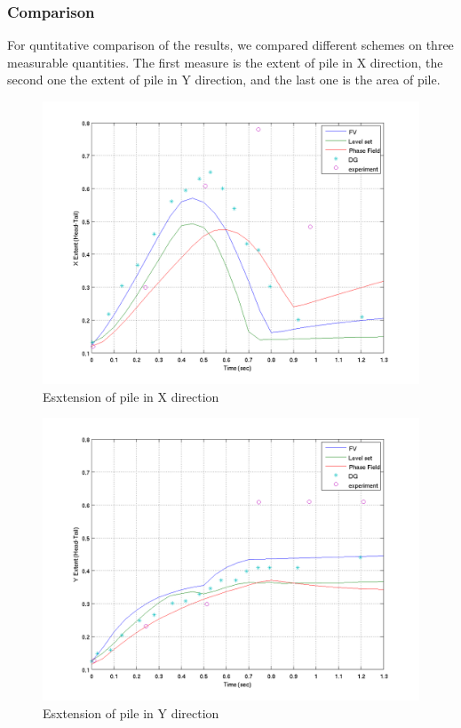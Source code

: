 \documentclass[letterpaper,10pt]{article}
\begin{document}
\subsubsection{Comparison}

For quntitative comparison of the results, we compared different schemes on three measurable quantities. 
The first measure is the extent of pile in X direction, the second one the extent of pile in Y direction, and 
the last one is the area of pile.


\begin{figure}[H]
\centerline{\includegraphics[scale=0.5]{IMAGES/xextent.png}}
\caption{Esxtension of pile in X direction}
\label{xextent}
\end{figure}


\begin{figure}[H]
\centerline{\includegraphics[scale=0.5]{IMAGES/yextent.png}}
\caption{Esxtension of pile in Y direction}
\label{yextent}
\end{figure}
\end{document}
